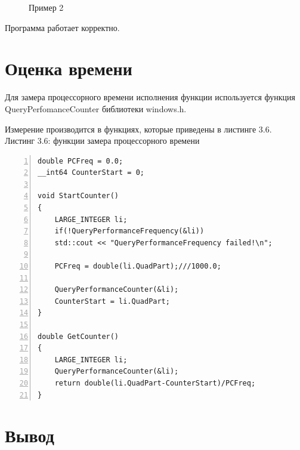 \documentclass[12pt,a4paper]{report}
\begin{document}
\begin{figure}[h!]
    \caption{Пример 2}
    \label{fig:image}
\end{figure}

Программа работает корректно.

\newpage
\section{Оценка времени}

Для замера процессорного времени исполнения функции используется функция 
QueryPerfomanceCounter библиотеки windows.h. \cite{}

Измерение производится в функциях, которые приведены в листинге 3.6.
 \\

\textrm{Листинг 3.6: функции замера процессорного времени}
\begin{lstlisting}[frame=single, numbers=left]
double PCFreq = 0.0;
__int64 CounterStart = 0;
    
void StartCounter()
{
    LARGE_INTEGER li;
    if(!QueryPerformanceFrequency(&li))
    std::cout << "QueryPerformanceFrequency failed!\n";
    
    PCFreq = double(li.QuadPart);///1000.0;
    
    QueryPerformanceCounter(&li);
    CounterStart = li.QuadPart;
}
    
double GetCounter()
{
    LARGE_INTEGER li;
    QueryPerformanceCounter(&li);
    return double(li.QuadPart-CounterStart)/PCFreq;
}
\end{lstlisting}

\section{Вывод}
\end{document}
